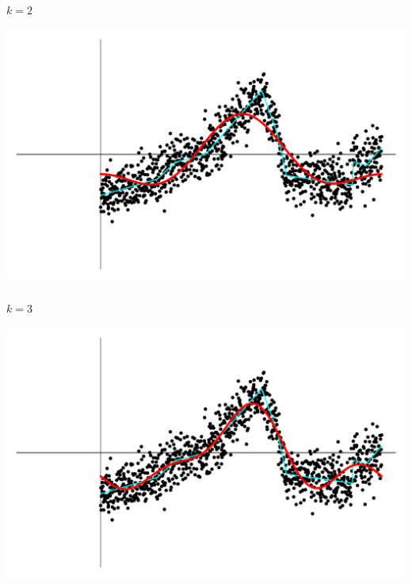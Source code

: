 \begin{frame}[fragile] \frametitle{}

$k=2$

\includegraphics[width=\linewidth]{img/fig07.pdf}

\end{frame}


\begin{frame}[fragile] \frametitle{}

$k=3$

\includegraphics[width=\linewidth]{img/fig08.pdf}

\end{frame}


